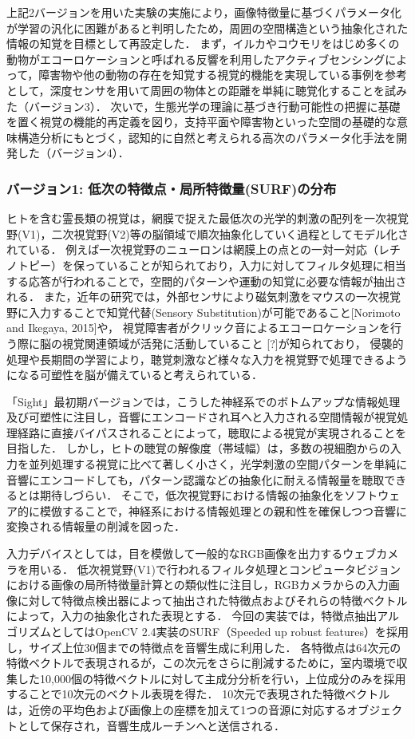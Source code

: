 上記2バージョンを用いた実験の実施により，画像特徴量に基づくパラメータ化が学習の汎化に困難があると判明したため，周囲の空間構造という抽象化された情報の知覚を目標として再設定した．
まず，イルカやコウモリをはじめ多くの動物がエコーロケーションと呼ばれる反響を利用したアクティブセンシングによって，障害物や他の動物の存在を知覚する視覚的機能を実現している事例を参考として，深度センサを用いて周囲の物体との距離を単純に聴覚化することを試みた（バージョン3）．
次いで，生態光学の理論に基づき行動可能性の把握に基礎を置く視覚の機能的再定義を図り，支持平面や障害物といった空間の基礎的な意味構造分析にもとづく，認知的に自然と考えられる高次のパラメータ化手法を開発した（バージョン4）．

\subsubsection{バージョン1: 低次の特徴点・局所特徴量(SURF)の分布}

ヒトを含む霊長類の視覚は，網膜で捉えた最低次の光学的刺激の配列を一次視覚野(V1)，二次視覚野(V2)等の脳領域で順次抽象化していく過程としてモデル化されている．
例えば一次視覚野のニューロンは網膜上の点との一対一対応（レチノトピー）を保っていることが知られており，入力に対してフィルタ処理に相当する応答が行われることで，空間的パターンや運動の知覚に必要な情報が抽出される．
また，近年の研究では，外部センサにより磁気刺激をマウスの一次視覚野に入力することで知覚代替(Sensory Substitution)が可能であること[Norimoto and Ikegaya, 2015]や，
視覚障害者がクリック音によるエコーロケーションを行う際に脳の視覚関連領域が活発に活動していること
[?]が知られており，
侵襲的処理や長期間の学習により，聴覚刺激など様々な入力を視覚野で処理できるようになる可塑性を脳が備えていると考えられている．

「Sight」最初期バージョンでは，こうした神経系でのボトムアップな情報処理及び可塑性に注目し，音響にエンコードされ耳へと入力される空間情報が視覚処理経路に直接バイパスされることによって，聴取による視覚が実現されることを目指した．
しかし，ヒトの聴覚の解像度（帯域幅）は，多数の視細胞からの入力を並列処理する視覚に比べて著しく小さく，光学刺激の空間パターンを単純に音響にエンコードしても，パターン認識などの抽象化に耐える情報量を聴取できるとは期待しづらい．
そこで，低次視覚野における情報の抽象化をソフトウェア的に模倣することで，神経系における情報処理との親和性を確保しつつ音響に変換される情報量の削減を図った．

入力デバイスとしては，目を模倣して一般的なRGB画像を出力するウェブカメラを用いる．
低次視覚野(V1)で行われるフィルタ処理とコンピュータビジョンにおける画像の局所特徴量計算との類似性に注目し，RGBカメラからの入力画像に対して特徴点検出器によって抽出された特徴点およびそれらの特徴ベクトルによって，入力の抽象化された表現とする．
今回の実装では，特徴点抽出アルゴリズムとしてはOpenCV 2.4実装のSURF（Speeded up robust features）を採用し，サイズ上位30個までの特徴点を音響生成に利用した．
各特徴点は64次元の特徴ベクトルで表現されるが，この次元をさらに削減するために，室内環境で収集した10,000個の特徴ベクトルに対して主成分分析を行い，上位成分のみを採用することで10次元のベクトル表現を得た．
10次元で表現された特徴ベクトルは，近傍の平均色および画像上の座標を加えて1つの音源に対応するオブジェクトとして保存され，音響生成ルーチンへと送信される．

